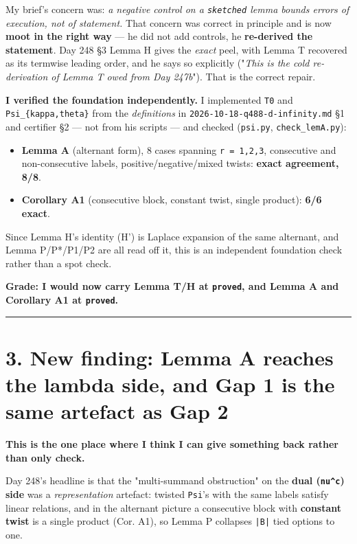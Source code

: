 \documentclass[11pt,a4paper]{article}
\begin{document}
My brief's concern was: \emph{a negative control on a \mbox{\texttt{sketched}} lemma bounds errors of execution, not of statement.} That concern was correct in principle and is now \textbf{moot in the right way} --- he did not add controls, he \textbf{re-derived the statement}. Day 248 \S{}3 Lemma H gives the \emph{exact} peel, with Lemma T recovered as its termwise leading order, and he says so explicitly ("\emph{This is the cold re-derivation of Lemma T owed from Day 247b}"). That is the correct repair.

\textbf{I verified the foundation independently.} I implemented \mbox{\texttt{T0}} and \mbox{\texttt{Psi\_\{kappa,theta\}}} from the \emph{definitions} in \mbox{\texttt{2026-10-18-q488-d-infinity.md}} \S{}1 and certifier \S{}2 --- not from his scripts --- and checked (\mbox{\texttt{psi.py}}, \mbox{\texttt{check\_lemA.py}}):

\begin{itemize}
\item \textbf{Lemma A} (alternant form), 8 cases spanning \mbox{\texttt{r = 1,2,3}}, consecutive and non-consecutive labels, positive/negative/mixed twists: \textbf{exact agreement, 8/8}.
\item \textbf{Corollary A1} (consecutive block, constant twist, single product): \textbf{6/6 exact}.
\end{itemize}

Since Lemma H's identity (H') is Laplace expansion of the same alternant, and Lemma P/P*/P1/P2 are all read off it, this is an independent foundation check rather than a spot check.

\textbf{Grade: I would now carry Lemma T/H at \mbox{\texttt{proved}}, and Lemma A and Corollary A1 at \mbox{\texttt{proved}}.}

\medskip\hrule\medskip

\section*{3. New finding: Lemma A reaches the lambda side, and Gap 1 is the same artefact as Gap 2}

\textbf{This is the one place where I think I can give something back rather than only check.}

Day 248's headline is that the "multi-summand obstruction" on the \textbf{dual (\mbox{\texttt{nu\textasciicircum{}c}}) side} was a \emph{representation} artefact: twisted \mbox{\texttt{Psi}}'s with the same labels satisfy linear relations, and in the alternant picture a consecutive block with \textbf{constant twist} is a single product (Cor. A1), so Lemma P collapses \mbox{\texttt{|B|}} tied options to one.
\end{document}
